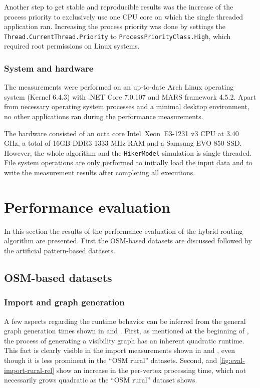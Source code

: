 			Another step to get stable and reproducible results was the increase of the process priority to exclusively use one CPU core on which the single threaded application ran.
			Increasing the process priority was done by settings the \texttt{Thread.CurrentThread.Priority} to \texttt{ProcessPriorityClass.High}, which required root permissions on Linux systems.
		
		\subsubsection{System and hardware}
		
			The measurements were performed on an up-to-date Arch Linux operating system (Kernel 6.4.3) with .NET Core 7.0.107 and MARS framework 4.5.2.
			Apart from necessary operating system processes and a minimal desktop environment, no other applications ran during the performance measurements.
			
			The hardware consisted of an octa core Intel\textregistered\ Xeon\textregistered\ E3-1231 v3 CPU at 3.40 GHz, a total of 16GB DDR3 1333 MHz RAM and a Samsung EVO 850 SSD.
			However, the whole algorithm and the \texttt{HikerModel} simulation is single threaded.
			File system operations are only performed to initially load the input data and to write the measurement results after completing all executions.
	
\section{Performance evaluation}

	In this section the results of the performance evaluation of the hybrid routing algorithm are presented.
	First the OSM-based datasets are discussed followed by the artificial pattern-based datasets.

	\subsection{OSM-based datasets}
		
		\subsubsection{Import and graph generation}
		
			A few aspects regarding the runtime behavior can be inferred from the general graph generation times shown in  and .
			First, as mentioned at the beginning of , the process of generating a visibility graph has an inherent quadratic runtime.
			This fact is clearly visible in the import measurements shown in  and , even though it is less prominent in the \enquote{OSM rural} datasets.
			Second,  and \ref{fig:eval-import-rural-rel} show an increase in the per-vertex processing time, which not necessarily grows quadratic as the \enquote{OSM rural} dataset shows.
			
